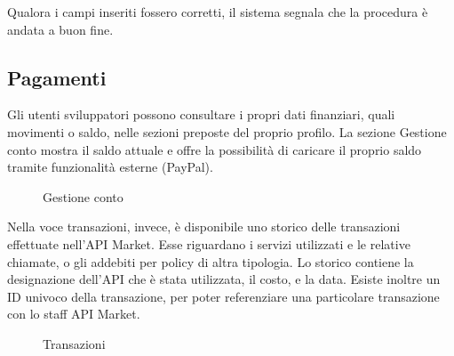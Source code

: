 Qualora i campi inseriti fossero corretti, il sistema segnala che la procedura è andata a buon fine.

\subsection{Pagamenti}

Gli utenti sviluppatori possono consultare i propri dati finanziari, quali movimenti o saldo, nelle sezioni preposte del proprio profilo. La sezione Gestione conto mostra il saldo attuale e offre la possibilità di caricare il proprio saldo tramite funzionalità esterne (PayPal).

\label{Gestione conto}
\begin{figure}[H]
	\centering
	\caption{Gestione conto}
\end{figure}

Nella voce transazioni, invece, è disponibile uno storico delle transazioni effettuate nell'API Market. Esse riguardano i servizi utilizzati e le relative chiamate, o gli addebiti per policy di altra tipologia. Lo storico contiene la designazione dell'API che è stata utilizzata, il costo, e la data. Esiste inoltre un ID univoco della transazione, per poter referenziare una particolare transazione con lo staff API Market.

\label{Transazioni}
\begin{figure}[H]
	\centering
	\caption{Transazioni}
\end{figure}